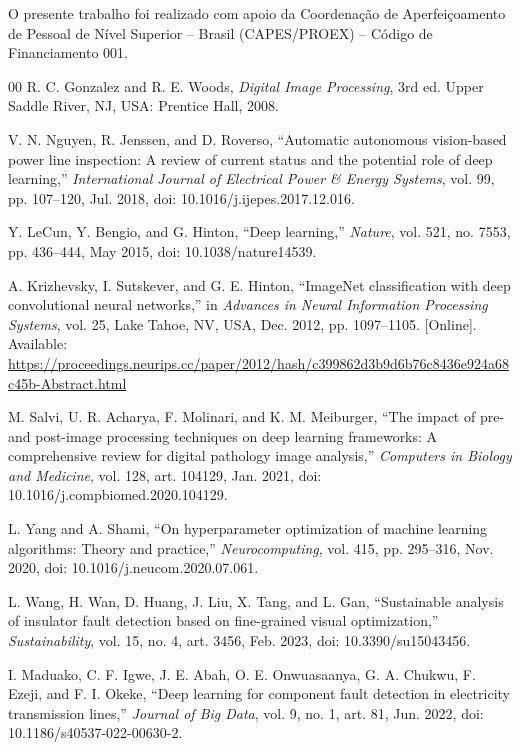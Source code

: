 \documentclass[conference]{IEEEtran}
\begin{document}
O presente trabalho foi realizado com apoio da Coordenação de Aperfeiçoamento de Pessoal de Nível Superior -- Brasil (CAPES/PROEX) -- Código de Financiamento 001.

\begin{thebibliography}{00}
 R. C. Gonzalez and R. E. Woods, \textit{Digital Image Processing}, 3rd ed. Upper Saddle River, NJ, USA: Prentice Hall, 2008.

 V. N. Nguyen, R. Jenssen, and D. Roverso, ``Automatic autonomous vision-based power line inspection: A review of current status and the potential role of deep learning,'' \textit{International Journal of Electrical Power \& Energy Systems}, vol. 99, pp. 107--120, Jul. 2018, doi: 10.1016/j.ijepes.2017.12.016.

 Y. LeCun, Y. Bengio, and G. Hinton, ``Deep learning,'' \textit{Nature}, vol. 521, no. 7553, pp. 436--444, May 2015, doi: 10.1038/nature14539.

 A. Krizhevsky, I. Sutskever, and G. E. Hinton, ``ImageNet classification with deep convolutional neural networks,'' in \textit{Advances in Neural Information Processing Systems}, vol. 25, Lake Tahoe, NV, USA, Dec. 2012, pp. 1097--1105. [Online]. Available: \url{https://proceedings.neurips.cc/paper/2012/hash/c399862d3b9d6b76c8436e924a68c45b-Abstract.html}

 M. Salvi, U. R. Acharya, F. Molinari, and K. M. Meiburger, ``The impact of pre- and post-image processing techniques on deep learning frameworks: A comprehensive review for digital pathology image analysis,'' \textit{Computers in Biology and Medicine}, vol. 128, art. 104129, Jan. 2021, doi: 10.1016/j.compbiomed.2020.104129.

 L. Yang and A. Shami, ``On hyperparameter optimization of machine learning algorithms: Theory and practice,'' \textit{Neurocomputing}, vol. 415, pp. 295--316, Nov. 2020, doi: 10.1016/j.neucom.2020.07.061.

 L. Wang, H. Wan, D. Huang, J. Liu, X. Tang, and L. Gan, ``Sustainable analysis of insulator fault detection based on fine-grained visual optimization,'' \textit{Sustainability}, vol. 15, no. 4, art. 3456, Feb. 2023, doi: 10.3390/su15043456.

 I. Maduako, C. F. Igwe, J. E. Abah, O. E. Onwuasaanya, G. A. Chukwu, F. Ezeji, and F. I. Okeke, ``Deep learning for component fault detection in electricity transmission lines,'' \textit{Journal of Big Data}, vol. 9, no. 1, art. 81, Jun. 2022, doi: 10.1186/s40537-022-00630-2.


\end{thebibliography}
\end{document}
